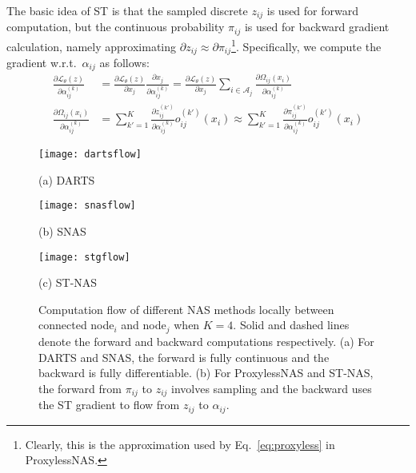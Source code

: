 \documentclass{article}
\newcommand{\neqref}{Eq.~\eqref}
\begin{document}
The basic idea of ST is that the sampled discrete $z_{ij}$ is used for forward computation, but the continuous probability $\pi_{ij}$ is used for backward gradient calculation, namely approximating $\partial{z_{ij}} \approx \partial{\pi_{ij}}$\footnote{Clearly, this is the approximation used by \neqref{eq:proxyless} in ProxylessNAS.}. Specifically, we compute the gradient w.r.t.~$\alpha_{ij}$ as follows:
\begin{equation}
    \begin{aligned}
        \frac{\partial{\mathcal{L}_\theta(z)}}{\partial{\alpha_{ij}^{(k)}}}
         & =\frac{\partial{\mathcal{L}_\theta(z)}}{\partial{x_j}} \frac{\partial{x_j}}{\partial{\alpha_{ij}^{(k)}}} =
        \frac{\partial{\mathcal{L}_\theta(z)}}{\partial{x_j}} \sum_{i\in\mathcal{A}_j} \frac{\partial{\Omega_{ij}(x_i)}}{\partial{\alpha_{ij}^{(k)}}}                                                           \\
\frac{\partial{\Omega_{ij}(x_i)}}{\partial{\alpha_{ij}^{(k)}}}
         & =\sum_{k'=1}^K \frac{\partial{z_{ij}^{(k')}}}{\partial{\alpha_{ij}^{(k)}}} o_{ij}^{(k')}(x_i) \approx \sum_{k'=1}^K \frac{\partial{\pi_{ij}^{(k')}}}{\partial{\alpha_{ij}^{(k)}}} o_{ij}^{(k')}(x_i)
    \end{aligned}
    \label{eq:ST-grad}
\end{equation}
\begin{figure}[t]
    \begin{minipage}[b]{0.32\linewidth}
        \centering
        \texttt{[image: dartsflow]}
\centerline{(a) DARTS}\medskip
    \end{minipage}
    \begin{minipage}[b]{0.32\linewidth}
        \centering
        \texttt{[image: snasflow]}
\centerline{(b) SNAS}\medskip
    \end{minipage}
    \begin{minipage}[b]{0.32\linewidth}
        \centering
        \texttt{[image: stgflow]}
\centerline{(c) ST-NAS}\medskip
    \end{minipage}
\vspace{-4mm}
    \caption{Computation flow of different NAS methods locally between connected node$_i$ and node$_j$ when $K=4$. Solid and dashed lines denote the forward and backward computations respectively. (a) For DARTS and SNAS, the forward is fully continuous and the backward is fully differentiable. (b) For ProxylessNAS and ST-NAS, the forward from $\pi_{ij}$ to $z_{ij}$ involves sampling and the backward uses the ST gradient to flow from $z_{ij}$ to $\alpha_{ij}$.}
    \label{fig:compute-flow}
\end{figure}
\end{document}

